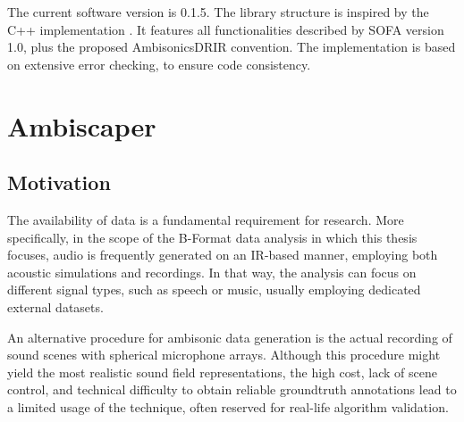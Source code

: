 The current software version is 0.1.5. The library structure is inspired by the C++ implementation \cite{api_cpp}. 
It features all functionalities described by SOFA version 1.0, plus the proposed AmbisonicsDRIR convention. 
The implementation is based on extensive error checking, to ensure code consistency.
 


\section{Ambiscaper}


\subsection{Motivation}

The availability of data is a fundamental requirement for research. 
More specifically, in the scope of the B-Format data analysis in which this thesis focuses, audio is frequently generated on an IR-based manner, employing both acoustic simulations and recordings. 
 In that way, the analysis can focus on different signal types, such as speech or music, usually employing dedicated external datasets. 

An alternative procedure for ambisonic data generation is the actual recording of sound scenes with spherical microphone arrays. 
Although this procedure might yield the most realistic sound field representations, the high cost, lack of scene control, and technical difficulty to obtain reliable groundtruth annotations lead to a limited usage of the technique, often reserved for real-life algorithm validation. 
 

